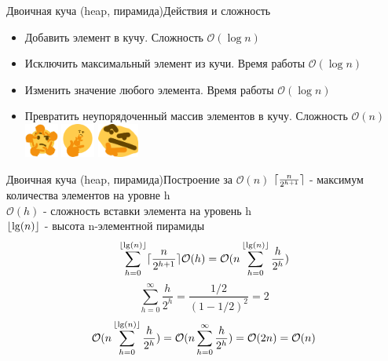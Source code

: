 \documentclass[10pt]{beamer}
\DeclarePairedDelimiter\ceil{\lceil}{\rceil}
\DeclarePairedDelimiter\floor{\lfloor}{\rfloor}
\begin{document}
\begin{frame}[fragile]{Двоичная куча (heap, пирамида)}{Действия и сложность}
\begin{itemize}
    \item Добавить элемент в кучу. Сложность $\mathcal{O}(\log {n})$
    \item Исключить максимальный элемент из кучи. Время работы  $\mathcal{O}(\log {n})$
    \item Изменить значение любого элемента. Время работы  $\mathcal{O}(\log {n})$
    \item Превратить неупорядоченный массив элементов в кучу. Сложность  $\mathcal{O}(n)$ 
    \includegraphics[height=3em]{Term_1/Source/Pirctures/thinking-emoji-circle.jpeg}
    \includegraphics[height=3em]{Term_1/Source/Pirctures/thinking-emoji-big.png}
    \includegraphics[height=3em]{Term_1/Source/Pirctures/thinking-emoji-paint.png}
\end{itemize}
\end{frame}

\begin{frame}[fragile]{Двоичная куча (heap, пирамида)}{Построение за $\mathcal{O}(n)$ }
$\ceil{\frac{n}{2^{h+1}}}$ - максимум количества элементов на уровне h\\
$\mathcal{O}(h)$ - сложность вставки элемента на уровень h\\
$\floor{\lg(n)}$ - высота n-элементной пирамиды\\
$$\sum_{h=0}^{\floor{\lg(n)}} \ceil{\frac{n}{2^{h+1}}} \mathcal{O}(h) = \mathcal{O}(n \sum_{h=0}^{\floor{\lg(n)}} \frac{h}{2^h}) $$
$$ \sum_{h=0}^{\infty} \frac{h}{2^h} = \frac{1/2}{(1-1/2)^2} = 2$$
$$ \mathcal{O}(n \sum_{h=0}^{\floor{\lg(n)}} \frac{h}{2^h}) = \mathcal{O}(n \sum_{h=0}^{\infty} \frac{h}{2^h}) = \mathcal{O}(2n) =  \mathcal{O}(n)$$
\end{frame}
\end{document}
